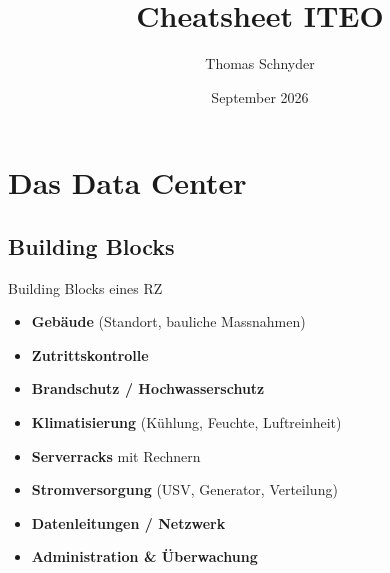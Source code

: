 \documentclass[a4paper, fontsize=7pt]{scrartcl}
\title{Cheatsheet ITEO}
\author{Thomas Schnyder}
\date{September 2026}
\begin{document}
\maketitle

\section{Das Data Center}

\subsection{Building Blocks}

\begin{mainbox}{Building Blocks eines RZ}
\begin{itemize}
    \item \textbf{Gebäude} (Standort, bauliche Massnahmen)
    \item \textbf{Zutrittskontrolle}
    \item \textbf{Brandschutz / Hochwasserschutz}
    \item \textbf{Klimatisierung} (Kühlung, Feuchte, Luftreinheit)
    \item \textbf{Serverracks} mit Rechnern
    \item \textbf{Stromversorgung} (USV, Generator, Verteilung)
    \item \textbf{Datenleitungen / Netzwerk}
    \item \textbf{Administration \& Überwachung}
\end{itemize}
\end{mainbox}
\end{document}
